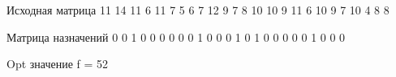Исходная матрица
   11   14   11    6   11
    7    5    6    7   12
    9    7    8   10   10
    9   11    6   10    9
    7   10    4    8    8

Матрица назначений
   0   0   1   0   0
   0   0   0   0   1
   0   0   0   1   0
   1   0   0   0   0
   0   1   0   0   0

Opt значение f = 52